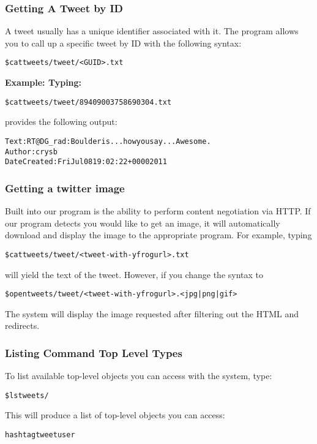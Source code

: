 \subsubsection{Getting A Tweet by ID}
A tweet usually has a unique identifier associated with it. The program allows you to call up a specific tweet by ID with the following syntax:
\begin{alltt}
    \$ cat tweets/tweet/<GUID>.txt
\end{alltt}
\bf{Example:} Typing:
\begin{alltt}
    \$ cat tweets/tweet/89409003758690304.txt
\end{alltt}

provides the following output:
\begin{alltt}
    Text: RT @DG_rad: Boulder is ... how you say ... Awesome.
    Author:crysb
    Date Created: Fri Jul 08 19:02:22 +0000 2011
\end{alltt}

\subsubsection{Getting a twitter image}
Built into our program is the ability to perform content negotiation via HTTP. If our program detects you would like to get an image, it will automatically download and display the image to the appropriate program. For example, typing
\begin{alltt}
    \$ cat tweets/tweet/<tweet-with-yfrogurl>.txt
\end{alltt}
will yield the text of the tweet. However, if you change the syntax to 
\begin{alltt}
    \$ open tweets/tweet/<tweet-with-yfrogurl>.<jpg|png|gif>
\end{alltt}
The system will display the image requested after filtering out the HTML and redirects. 
\subsubsection{Listing Command Top Level Types}
To list available top-level objects you can access with the system, type: 
\begin{alltt}
    \$ ls tweets/
\end{alltt}
This will produce a list of top-level objects you can access:
\begin{alltt}
    hashtag tweet user
\end{alltt}



